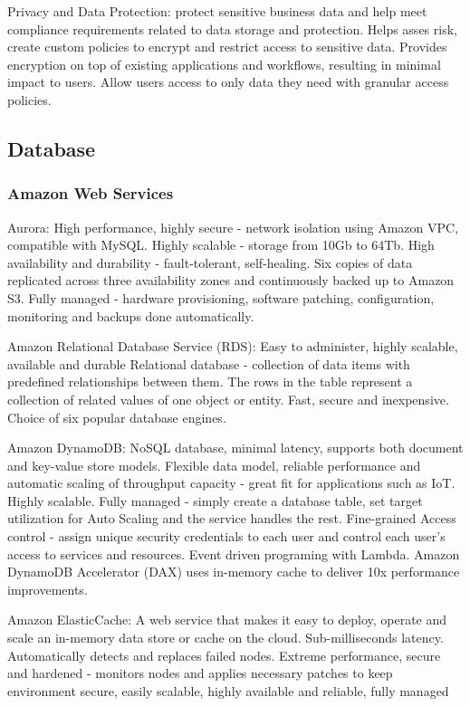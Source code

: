 Privacy and Data Protection: protect sensitive business data and help meet compliance requirements related to data storage and protection. Helps asses risk, create custom policies to encrypt and restrict access to sensitive data. Provides encryption on top of existing applications and workflows, resulting in minimal impact to users. Allow users access to only data they need with granular access policies.   

\subsection{Database}

\subsubsection{Amazon Web Services}
Aurora: High performance, highly secure - network isolation using Amazon VPC, compatible with MySQL. Highly scalable - storage from 10Gb to 64Tb. High availability and durability - fault-tolerant, self-healing. Six copies of data replicated across three availability zones and continuously backed up to Amazon S3. Fully managed - hardware provisioning, software patching, configuration, monitoring and backups done automatically. 

Amazon Relational Database Service (RDS):  Easy to administer, highly scalable, available and durable  Relational database - collection of data items with predefined relationships between them. The rows in the table represent a collection of related values of one object or entity. Fast, secure and inexpensive. Choice of six popular database engines. 

Amazon DynamoDB: NoSQL database, minimal latency, supports both document and key-value store models. Flexible data model, reliable performance and automatic scaling of throughput capacity - great fit for applications such as IoT. Highly scalable. Fully managed - simply create a database table, set target utilization for Auto Scaling and the service handles the rest. Fine-grained Access control - assign unique security credentials to each user and control each user's access to services and resources. Event driven programing with Lambda. Amazon DynamoDB Accelerator (DAX) uses in-memory cache to deliver 10x performance improvements. 

Amazon ElasticCache: A web service that makes it easy to deploy, operate and scale an in-memory data store or cache on the cloud. Sub-milliseconds latency. Automatically detects and replaces failed nodes. Extreme performance, secure and hardened - monitors nodes and applies necessary patches to keep environment secure, easily scalable, highly available and reliable, fully managed

